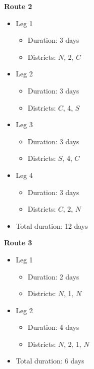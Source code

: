 \documentclass[10pt]{article}
\begin{document}
\begin{minipage}[t]{0.3\textwidth}
    \textbf{Route 2}
    \begin{itemize}
        \item Leg 1
        \begin{itemize}
            \item Duration: 3 days 
            \item Districts: $N $, 2, $C $
        \end{itemize}
        \item Leg 2
        \begin{itemize}
            \item Duration: 3 days 
            \item Districts: $C $, 4, $S $
        \end{itemize}
        \item Leg 3
        \begin{itemize}
            \item Duration: 3 days 
            \item Districts: $S $, 4, $C $
        \end{itemize}
        \item Leg 4
        \begin{itemize}
            \item Duration: 3 days 
            \item Districts: $C $, 2, $N $
        \end{itemize}
        \item Total duration: 12 days
    \end{itemize}
\end{minipage}
\hfill
\begin{minipage}[t]{0.3\textwidth}
    \textbf{Route 3}
    \begin{itemize}
        \item Leg 1
        \begin{itemize}
            \item Duration: 2 days 
            \item Districts: $N $, 1, $N $
        \end{itemize}
        \item Leg 2
        \begin{itemize}
            \item Duration: 4 days 
            \item Districts: $N $, 2, 1, $N $
        \end{itemize}
        \item Total duration: 6 days
    \end{itemize}
\end{minipage}
\end{document}
